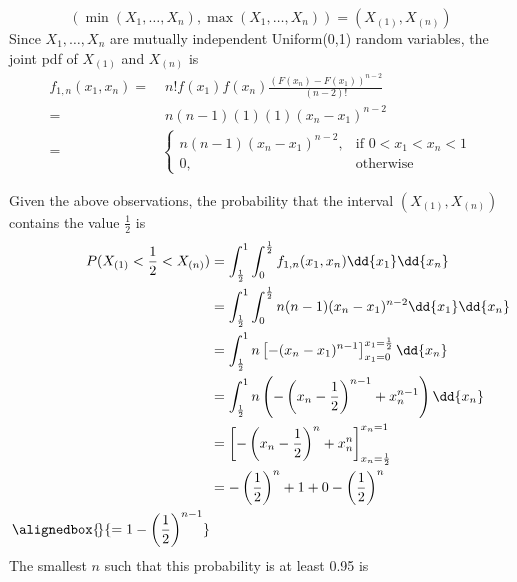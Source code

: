 \documentclass[hwnumber=3,studentnumber=20053722]{mthe353answer}
\begin{document}
  \begin{questions}
    \setcounter{question}{3}
    \question{}
    \begin{solution}
      \begin{note}
        \begin{equation*}
          (\min(X_1, \dots, X_n), \max(X_1, \dots, X_n)) = (X_{(1)}, X_{(n)})
        \end{equation*}
        Since \(X_1, \dots, X_n\) are mutually independent Uniform(0,1) random
        variables, the joint pdf of \(X_{(1)}\) and \(X_{(n)}\) is
        \begin{align*}
          f_{1,n}(x_1, x_n) =&\; n!f(x_1)f(x_n)\frac{(F(x_n) - F(x_1))^{n-2}}{(n-2)!}\\
          =&\; n(n-1)(1)(1)(x_n-x_1)^{n-2}\\
          =&
          \begin{cases}
            n(n-1)(x_n-x_1)^{n-2}, & \text{if } 0 < x_1 < x_n < 1\\
            0, & \text{otherwise}
          \end{cases}
        \end{align*}
      \end{note}
      Given the above observations, the probability that the interval \((X_{(1)}, X_{(n)})\)
      contains the value \(\frac{1}{2}\) is
      \begin{align*}
        P(X_{(1)} < \frac{1}{2} < X_{(n)})
        &= \int_{\frac{1}{2}}^1 \int_0^{\frac{1}{2}} f_{1,n}(x_1, x_n) \dd{x_1} \dd{x_n}\\
        &= \int_{\frac{1}{2}}^1 \int_0^{\frac{1}{2}} n(n-1)(x_n-x_1)^{n-2} \dd{x_1} \dd{x_n}\\
        &= \int_{\frac{1}{2}}^1 n\left[-(x_n-x_1)^{n-1}\right]_{x_1=0}^{x_1=\frac{1}{2}} \dd{x_n}\\
        &= \int_{\frac{1}{2}}^1 n\left(- \left(x_n - \frac{1}{2}\right)^{n-1} + x_n^{n-1}\right) \dd{x_n}\\
        &= \left[- \left(x_n - \frac{1}{2}\right)^n + x_n^n\right]_{x_n=\frac{1}{2}}^{x_n=1}\\
        &= -\left(\frac{1}{2}\right)^n + 1 + 0 - \left(\frac{1}{2}\right)^n\\
        \alignedbox{\phantom{\!}}{= 1 - \left(\frac{1}{2}\right)^{n-1}}\\
      \end{align*}
      The smallest \(n\) such that this probability is at least 0.95 is
      \begin{align*}

\end{align*}
\end{solution}
\end{questions}
\end{document}
